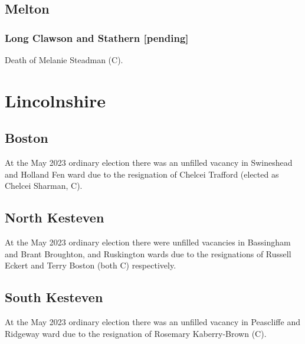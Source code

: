 \documentclass[a4paper,openany]{book}
\begin{document}
\begin{resultsiii}
\subsection*{Melton}

\subsubsection*{Long Clawson and Stathern \hspace*{\fill}\nolinebreak[1]%
	\enspace\hspace*{\fill}
	[pending]}


Death of Melanie Steadman (C).

\section{Lincolnshire}

\subsection*{Boston}

At the May 2023 ordinary election there was an unfilled vacancy in Swineshead and Holland Fen ward due to the resignation of Chelcei Trafford (elected as Chelcei Sharman, C).%

\subsection*{North Kesteven}

At the May 2023 ordinary election there were unfilled vacancies in Bassingham and Brant Broughton, and Ruskington wards due to the resignations of Russell Eckert and Terry Boston (both C) respectively.%

\subsection*{South Kesteven}

At the May 2023 ordinary election there was an unfilled vacancy in Peascliffe and Ridgeway ward due to the resignation of Rosemary Kaberry-Brown (C).%


\end{resultsiii}
\end{document}
